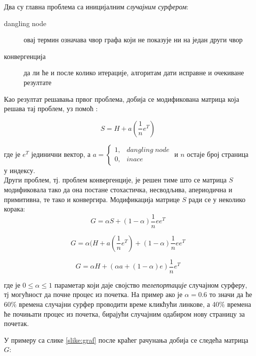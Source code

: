 Два су главна проблема са иницијалним \emph{случајним сурфером}:

\begin{description}
\item[dangling node] овај термин означава чвор графа који не показује ни на један други чвор
\item[конвергенција] да ли ће и после колико итерације, алгоритам дати исправне и очекиване резултате
\end{description}

Као резултат решавања првог проблема, добија се модификована матрица која решава тај проблем, уз помоћ :

\begin{equation}
S = H + a(\frac{1}{n}e^{T})
\end{equation}

где је $e^T$ јединични вектор, а $a = \left\{\begin{matrix}
1, & dangling\; node \\
0, & inace
\end{matrix}\right.$ и $n$ остаје број страница у индексу.\\

Други проблем, тј. проблем конвергенције, је решен тиме што се матрица $S$ модификовала тако да она постане стохастичка, несводљива, апериодична и примитивна, те тако и конвергира. Модификација матрице $S$ ради се у неколико корака:
\begin{equation}
G = \alpha S + (1-\alpha)\frac{1}{n}ee^{T}
\end{equation}

\begin{equation}
G = \alpha(H + a(\frac{1}{n}e^{T})+(1-\alpha)\frac{1}{n}ee^{T}
\end{equation}

\begin{equation}
G = \alpha H + (\alpha a + (1-\alpha)e)\frac{1}{n}e^{T}
\end{equation}

где је $0\leqslant\alpha\leqslant1$ параметар који даје својство \emph{телепортације} случајном сурферу, тј могућност да почне процес из почетка. На пример ако је $\alpha=0.6$ то значи да ће 60\% времена случајни сурфер проводити време кликћући линкове, а 40\% времена ће почињати процес из почетка, бирајући случајним одабиром нову страницу за почетак.

У примеру са слике \ref{slike:graf} после краћег рачунања добија се следећа матрица $G$:

